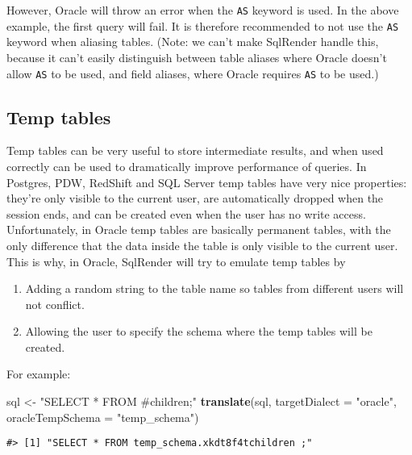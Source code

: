 \documentclass[
]{article}
\newenvironment{Shaded}{\begin{snugshade}}{\end{snugshade}}
\newcommand{\DataTypeTok}[1]{\textcolor[rgb]{0.13,0.29,0.53}{#1}}
\newcommand{\KeywordTok}[1]{\textcolor[rgb]{0.13,0.29,0.53}{\textbf{#1}}}
\newcommand{\NormalTok}[1]{#1}
\newcommand{\StringTok}[1]{\textcolor[rgb]{0.31,0.60,0.02}{#1}}
\providecommand{\tightlist}{%
  \setlength{\itemsep}{0pt}\setlength{\parskip}{0pt}}
\begin{document}
However, Oracle will throw an error when the \texttt{AS} keyword is
used. In the above example, the first query will fail. It is therefore
recommended to not use the \texttt{AS} keyword when aliasing tables.
(Note: we can't make SqlRender handle this, because it can't easily
distinguish between table aliases where Oracle doesn't allow \texttt{AS}
to be used, and field aliases, where Oracle requires \texttt{AS} to be
used.)

\hypertarget{temp-tables}{%
\subsection{Temp tables}\label{temp-tables}}

Temp tables can be very useful to store intermediate results, and when
used correctly can be used to dramatically improve performance of
queries. In Postgres, PDW, RedShift and SQL Server temp tables have very
nice properties: they're only visible to the current user, are
automatically dropped when the session ends, and can be created even
when the user has no write access. Unfortunately, in Oracle temp tables
are basically permanent tables, with the only difference that the data
inside the table is only visible to the current user. This is why, in
Oracle, SqlRender will try to emulate temp tables by

\begin{enumerate}
\def\labelenumi{\arabic{enumi}.}
\tightlist
\item
  Adding a random string to the table name so tables from different
  users will not conflict.
\item
  Allowing the user to specify the schema where the temp tables will be
  created.
\end{enumerate}

For example:

\begin{Shaded}
\begin{Highlighting}[]
\NormalTok{sql <-}\StringTok{ "SELECT * FROM #children;"}
\KeywordTok{translate}\NormalTok{(sql, }\DataTypeTok{targetDialect =} \StringTok{"oracle"}\NormalTok{, }\DataTypeTok{oracleTempSchema =} \StringTok{"temp_schema"}\NormalTok{)}
\end{Highlighting}
\end{Shaded}

\begin{verbatim}
#> [1] "SELECT * FROM temp_schema.xkdt8f4tchildren ;"
\end{verbatim}
\end{document}
